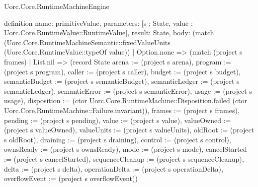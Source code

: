 \begin{lexlean}{Uorc.Core.RuntimeMachineEngine}
\begin{semanticmodule}
definition{
  name: primitiveValue,
  parameters: [s : State, value : Uorc.Core.RuntimeValue::RuntimeValue],
  result: State,
  body: (match (Uorc.Core.RuntimeMachineSemantic::fixedValueUnits (Uorc.Core.RuntimeValue::typeOf value))
    | Option.none => (match (project s frames)
      | List.nil => (record State {arena := (project s arena), program := (project s program), caller := (project s caller), budget := (project s budget), semanticBudget := (project s semanticBudget), semanticLedger := (project s semanticLedger), semanticError := (project s semanticError), usage := (project s usage), disposition := (ctor Uorc.Core.RuntimeMachine::Disposition.failed (ctor Uorc.Core.RuntimeMachine::Failure.invariant)), frames := (project s frames), pending := (project s pending), value := (project s value), valueOwned := (project s valueOwned), valueUnits := (project s valueUnits), oldRoot := (project s oldRoot), draining := (project s draining), control := (project s control), ownsReady := (project s ownsReady), mode := (project s mode), cancelStarted := (project s cancelStarted), sequenceCleanup := (project s sequenceCleanup), delta := (project s delta), operationDelta := (project s operationDelta), overflowEvent := (project s overflowEvent)})
}
\end{semanticmodule}
\end{lexlean}

